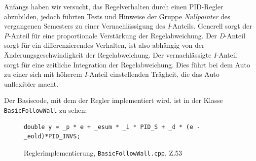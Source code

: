 Anfangs haben wir versucht, das Regelverhalten durch einen PID-Regler abzubilden, jedoch führten Tests und Hinweise der Gruppe \textit{Nullpointer} des vergangenen Semesters zu einer Vernachlässigung des \textit{I}-Anteils. Generell sorgt der \textit{P}-Anteil für eine proportionale Verstärkung der Regelabweichung. Der \textit{D}-Anteil sorgt für ein differenzierendes Verhalten, ist also abhängig von der Änderungsgeschwindigkeit der Regelabweichung.
Der vernachlässigte \textit{I}-Anteil sorgt für eine zeitliche Integration der Regelabweichung. Dies führt bei dem Auto zu einer sich mit höherem \textit{I}-Anteil einstellenden Trägheit, die das Auto unflexibler macht.

Der Basiscode, mit dem der Regler implementiert wird, ist in der Klasse \texttt{BasicFollowWall} zu sehen:

\begin{figure}[H]
\begin{lstlisting}[style=json]
double y = _p * e + _esum * _i * PID_S + _d * (e - _eold)*PID_INVS;
\end{lstlisting}
\centering
\caption{Reglerimplementierung, \texttt{BasicFollowWall.cpp}, Z.53}
\end{figure}

